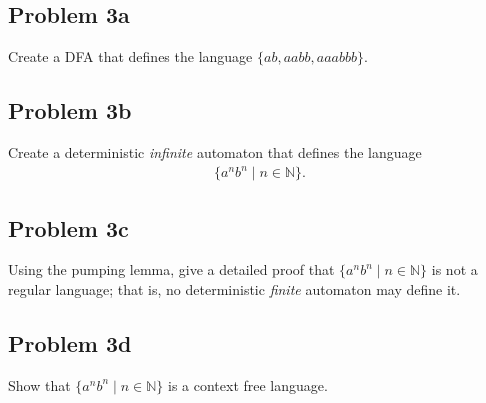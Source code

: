 \documentclass{article}
\begin{document}
\subsection{Problem 3a}
Create a DFA that defines the language $\{ab,aabb,aaabbb\}$.

\subsection{Problem 3b}
Create a deterministic \emph{infinite} automaton that defines the language
\begin{align*}
    \{a^n b^n\mid n\in\mathbb N\}.
\end{align*}

\subsection{Problem 3c}
Using the pumping lemma, give a detailed proof that $\{a^n b^n\mid n\in\mathbb N\}$ is not a regular language; that is, no deterministic \emph{finite} automaton may define it.

\subsection{Problem 3d}
Show that $\{a^n b^n\mid n\in\mathbb N\}$ is a context free language.
\end{document}
